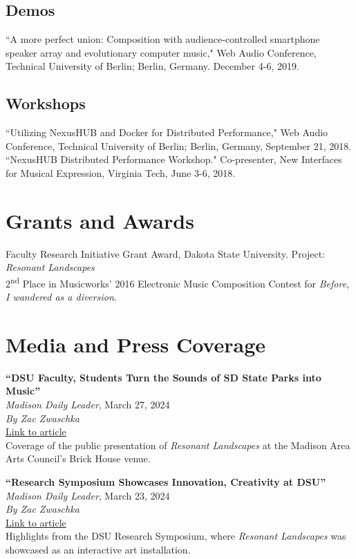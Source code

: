 \documentclass[10pt, a4paper]{article}
\newcommand{\years}[1]{\marginnote{\scriptsize #1}}
\begin{document}
\subsection*{Demos}
\years{2019} ``A more perfect union: Composition with audience-controlled smartphone speaker array and evolutionary computer music," Web Audio Conference, Technical University of Berlin; Berlin, Germany. December 4-6, 2019.

\subsection*{Workshops}
\years{2018} ``Utilizing NexusHUB and Docker for Distributed Performance," Web Audio Conference, Technical University of Berlin; Berlin, Germany, September 21, 2018. \\
``NexusHUB Distributed Performance Workshop." Co-presenter, New Interfaces for Musical Expression, Virginia Tech, June 3-6, 2018.



\section*{Grants and Awards}
\years{2023--24} Faculty Research Initiative Grant Award, Dakota State University. Project: \textit{Resonant Landscapes} \\
\years{2016} 2\textsuperscript{nd} Place in Musicworks’ 2016 Electronic Music Composition Contest for \textit{Before, I wandered as a diversion}. 

\section*{Media and Press Coverage}

\years{2024} \textbf{``DSU Faculty, Students Turn the Sounds of SD State Parks into Music''} \\
\textit{Madison Daily Leader}, March 27, 2024 \\
\textit{By Zac Zwaschka} \\
\href{https://www.madisondailyleader.com/news/local/article_c0bdd132-ec50-11ee-8049-a715d4e9b761.html}{Link to article} \\
Coverage of the public presentation of \textit{Resonant Landscapes} at the Madison Area Arts Council's Brick House venue.

\years{2024} \textbf{``Research Symposium Showcases Innovation, Creativity at DSU''} \\
\textit{Madison Daily Leader}, March 23, 2024 \\
\textit{By Zac Zwaschka} \\
\href{https://www.madisondailyleader.com/news/local/article_455caa5e-e85e-11ee-8628-cf0c5c2b7152.html}{Link to article} \\
Highlights from the DSU Research Symposium, where \textit{Resonant Landscapes} was showcased as an interactive art installation.
\end{document}
